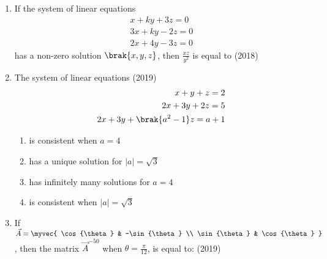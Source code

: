 \begin{enumerate}[label=\thesubsection.\arabic*.,ref=\thesubsection.\theenumi]
\begin{enumerate}
\end{enumerate} 
\item If the system of linear equations 
\begin{align*}x+ky+3z=0 \\
3x+ky-2z=0 \\
2x+4y-3z=0 \end{align*}
has a non-zero solution $$, then $$ is equal to 
\hfill{(2018)}
\begin{enumerate}
\end{enumerate}
\item The system of linear equations 
\hfill{(2019)}
\begin{align*}x+y+z=2 \\
2x+3y+2z=5 \\
2x+3y+\brak{a^2-1}z=a+1 \end{align*} 
\begin{multicols}{2}
\begin{enumerate}
    \item is consistent when $a=4$
    \item has a unique solution for $|a|= $
    \item has infinitely many solutions for $a=4$
    \item is consistent when $|a|= $
\end{enumerate}
\end{multicols}
\item If $= \myvec{
    \cos{\theta} & -\sin{\theta} \\
    \sin{\theta} & \cos{\theta}
}$, then the matrix $^{-50}$ when $\theta=$, is equal to: 
\hfill{(2019)}
\begin{enumerate}
\begin{multicols}{2}


\end{multicols}
\end{enumerate}
\end{enumerate}
